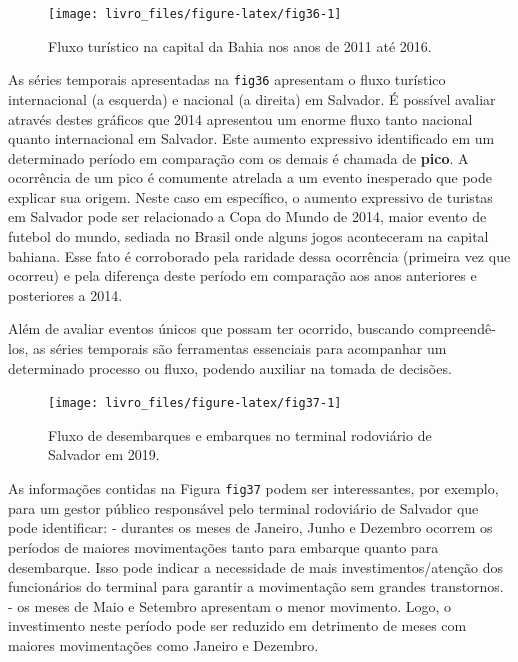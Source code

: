 \documentclass[
]{book}
\begin{document}
\begin{figure}

{\centering \texttt{[image: livro\_files/figure-latex/fig36-1]} 

}

\caption{Fluxo turístico na capital da Bahia nos anos de 2011 até 2016.}\label{fig:fig36}
\end{figure}

As séries temporais apresentadas na \texttt{fig36} apresentam o fluxo turístico internacional (a esquerda) e nacional (a direita) em Salvador. É possível avaliar através destes gráficos que 2014 apresentou um enorme fluxo tanto nacional quanto internacional em Salvador. Este aumento expressivo identificado em um determinado período em comparação com os demais é chamada de \textbf{pico}. A ocorrência de um pico é comumente atrelada a um evento inesperado que pode explicar sua origem. Neste caso em específico, o aumento expressivo de turistas em Salvador pode ser relacionado a Copa do Mundo de 2014, maior evento de futebol do mundo, sediada no Brasil onde alguns jogos aconteceram na capital bahiana. Esse fato é corroborado pela raridade dessa ocorrência (primeira vez que ocorreu) e pela diferença deste período em comparação aos anos anteriores e posteriores a 2014.

Além de avaliar eventos únicos que possam ter ocorrido, buscando compreendê-los, as séries temporais são ferramentas essenciais para acompanhar um determinado processo ou fluxo, podendo auxiliar na tomada de decisões.

\begin{figure}

{\centering \texttt{[image: livro\_files/figure-latex/fig37-1]} 

}

\caption{Fluxo de desembarques e embarques no terminal rodoviário de Salvador em 2019.}\label{fig:fig37}
\end{figure}

As informações contidas na Figura \texttt{fig37} podem ser interessantes, por exemplo, para um gestor público responsável pelo terminal rodoviário de Salvador que pode identificar:
- durantes os meses de Janeiro, Junho e Dezembro ocorrem os períodos de maiores movimentações tanto para embarque quanto para desembarque. Isso pode indicar a necessidade de mais investimentos/atenção dos funcionários do terminal para garantir a movimentação sem grandes transtornos.
- os meses de Maio e Setembro apresentam o menor movimento. Logo, o investimento neste período pode ser reduzido em detrimento de meses com maiores movimentações como Janeiro e Dezembro.
\end{document}
